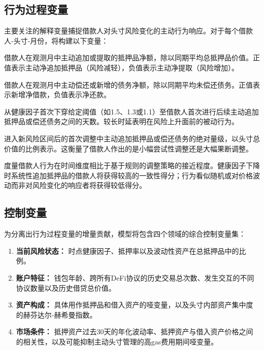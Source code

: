 \subsection{行为过程变量}

主要关注的解释变量捕捉借款人对头寸风险变化的主动行为响应。对于每个借款人-头寸-月份，将构建以下变量：

\begin{description}[leftmargin=*,labelindent=\parindent, itemindent=0pt]
\item[主动抵押品调整率。] 借款人在观测月中主动追加或提取的抵押品净额，除以同期平均总抵押品价值。正值表示主动净追加抵押品（风险减轻），负值表示主动净提取（风险增加）。

\item[主动债务管理率。] 借款人在观测月中主动偿还或新增的债务净额，除以同期平均未偿还债务。正值表示新增净借款，负值表示净还款。

\item[响应延迟。] 从健康因子首次下穿给定阈值（如1.5、1.3或1.1）至借款人首次进行后续主动追加抵押品或偿还债务之间的天数。较长时延表明在风险上升面前的被动行为。

\item[调整强度。] 进入新风险区间后的首次调整中主动追加抵押品或偿还债务的绝对量级，以头寸总价值的比例表示。这衡量了借款人作出的是小幅尝试性调整还是大幅果断调整。

\item[行为一致性。] 度量借款人行为在时间维度相比于基于规则的调整策略的接近程度。健康因子下降时系统性追加抵押品的借款人将获得较高的一致性得分；行为看似随机或对价格波动而非对风险变化的响应者将获得较低得分。
\end{description}

\subsection{控制变量}

为分离出行为过程变量的增量贡献，模型将包含四个领域的综合控制变量集：

\begin{enumerate}[leftmargin=*,labelindent=\parindent, itemindent=0pt]
\item \textbf{当前风险状态：} 时点健康因子、抵押率以及波动性资产在总抵押品中的比例。
\item \textbf{账户特征：} 钱包年龄、跨所有DeFi协议的历史交易总次数、发生交互的不同协议数量以及历史借贷总价值。
\item \textbf{资产构成：} 具体用作抵押品和借入资产的哑变量，以及头寸内部资产集中度的赫芬达尔-赫希曼指数。
\item \textbf{市场条件：} 抵押资产过去30天的年化波动率、抵押资产与借入资产价格之间的相关性，以及可能抑制主动头寸管理的高gas费用期间哑变量。
\end{enumerate}

